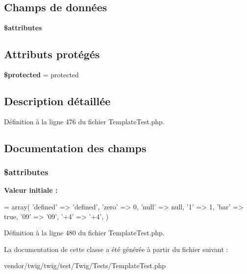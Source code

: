 \subsection*{Champs de données}
\begin{DoxyCompactItemize}
\item 
{\bfseries \$attributes}
\end{DoxyCompactItemize}
\subsection*{Attributs protégés}
\begin{DoxyCompactItemize}
\item 
{\bfseries \$protected} = \textquotesingle{}protected\textquotesingle{}\hypertarget{class_twig___template_array_access_object_a2b7c879294b290c4a388522ce49a08d6}{}\label{class_twig___template_array_access_object_a2b7c879294b290c4a388522ce49a08d6}

\end{DoxyCompactItemize}


\subsection{Description détaillée}


Définition à la ligne 476 du fichier Template\+Test.\+php.



\subsection{Documentation des champs}
\subsubsection[{\texorpdfstring{\$attributes}{$attributes}}]{\setlength{\rightskip}{0pt plus 5cm}\$attributes}\hypertarget{class_twig___template_array_access_object_adc851f7a62250e75df0490c0280aef4c}{}\label{class_twig___template_array_access_object_adc851f7a62250e75df0490c0280aef4c}
{\bfseries Valeur initiale \+:}
\begin{DoxyCode}
= array(
        \textcolor{stringliteral}{'defined'} => \textcolor{stringliteral}{'defined'},
        \textcolor{stringliteral}{'zero'} => 0,
        \textcolor{stringliteral}{'null'} => null,
        \textcolor{charliteral}{'1'} => 1,
        \textcolor{stringliteral}{'bar'} => \textcolor{keyword}{true},
        \textcolor{stringliteral}{'09'} => \textcolor{stringliteral}{'09'},
        \textcolor{stringliteral}{'+4'} => \textcolor{stringliteral}{'+4'},
    )
\end{DoxyCode}


Définition à la ligne 480 du fichier Template\+Test.\+php.



La documentation de cette classe a été générée à partir du fichier suivant \+:\begin{DoxyCompactItemize}
\item 
vendor/twig/twig/test/\+Twig/\+Tests/Template\+Test.\+php\end{DoxyCompactItemize}
